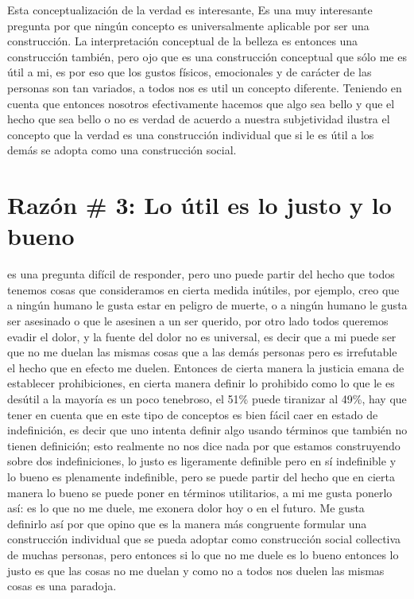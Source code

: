 \documentclass{article}
\begin{document}
Esta conceptualización de la verdad es interesante,  Es una muy interesante pregunta por que ningún concepto es universalmente aplicable por ser una construcción. 
La interpretación conceptual de la belleza es entonces una construcción también, pero ojo que es una construcción conceptual que sólo me es útil a mi, es por eso que los gustos físicos, emocionales y de carácter de las personas son tan variados, a todos nos es util un concepto diferente. 
Teniendo en cuenta que entonces nosotros efectivamente hacemos que algo sea bello y que el hecho que sea bello o no es verdad de acuerdo a nuestra subjetividad ilustra el concepto que la verdad es una construcción individual que si le es útil a los demás se adopta como una construcción social.


\section{Razón \# 3: Lo útil es lo justo y lo bueno}
 es una pregunta difícil de responder, pero uno puede partir del hecho que todos tenemos cosas que consideramos en cierta medida inútiles, por ejemplo, creo que a ningún humano le gusta estar en peligro de muerte, o a ningún humano le gusta ser asesinado o que le asesinen a un ser querido, por otro lado todos queremos evadir el dolor, y la fuente del dolor no es universal, es decir que a mi puede ser que no me duelan las mismas cosas que a las demás personas pero es irrefutable el hecho que en efecto me duelen. Entonces de cierta manera la justicia emana de establecer prohibiciones, en cierta manera definir lo prohibido como lo que le es desútil a la mayoría es un poco tenebroso, el 51\% puede tiranizar al 49\%, hay que tener en cuenta que en este tipo de conceptos es bien fácil caer en estado de indefinición, es decir que uno intenta definir algo usando términos que también no tienen definición;  esto realmente no nos dice nada por que estamos construyendo sobre dos indefiniciones, lo justo es ligeramente definible pero en sí indefinible y lo bueno es plenamente indefinible, pero se puede partir del hecho que en cierta manera lo bueno se puede poner en términos utilitarios, a mi me gusta ponerlo así: es lo que no me duele, me exonera dolor hoy o en el futuro. 
Me gusta definirlo así por que opino que es la manera más congruente formular una construcción individual que se pueda adoptar como construcción social collectiva de muchas personas, pero entonces si lo que no me duele es lo bueno entonces lo justo es que las cosas no me duelan y como no a todos nos duelen las mismas cosas es una paradoja. 
\end{document}
